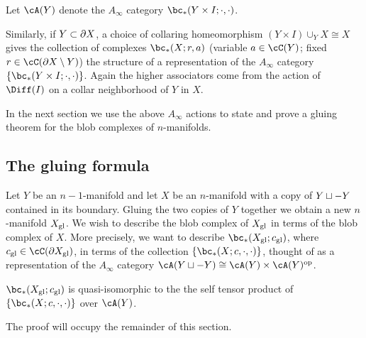 
Let $\cA(Y)$ denote the $A_\infty$ category $\bc_*(Y\times I; \cdot, \cdot)$.

Similarly, if $Y \subset \partial X$, a choice of collaring homeomorphism
$(Y\times I) \cup_Y X \cong X$ gives the collection of complexes $\bc_*(X; r, a)$
(variable $a \in \cC(Y)$; fixed $r \in \cC(\bd X \setmin Y)$) the structure of a representation of the
$A_\infty$ category $\{\bc_*(Y\times I; \cdot, \cdot)\}$.
Again the higher associators come from the action of $\Diff(I)$ on a collar neighborhood
of $Y$ in $X$.

In the next section we use the above $A_\infty$ actions to state and prove
a gluing theorem for the blob complexes of $n$-manifolds.


\subsection{The gluing formula}
\label{sec:gluing-formula}%
Let $Y$ be an $n{-}1$-manifold and let $X$ be an $n$-manifold with a copy
of $Y \sqcup -Y$ contained in its boundary.
Gluing the two copies of $Y$ together we obtain a new $n$-manifold $X_\mathrm{gl}$.
We wish to describe the blob complex of $X_\mathrm{gl}$ in terms of the blob complex
of $X$.
More precisely, we want to describe $\bc_*(X\sgl; c\sgl)$,
where $c\sgl \in \cC(\bd X\sgl)$,
in terms of the collection $\{\bc_*(X; c, \cdot, \cdot)\}$, thought of as a representation
of the $A_\infty$ category $\cA(Y\du-Y) \cong \cA(Y)\times \cA(Y)\op$.

\begin{thm}
$\bc_*(X\sgl; c\sgl)$ is quasi-isomorphic to the the self tensor product
of $\{\bc_*(X; c, \cdot, \cdot)\}$ over $\cA(Y)$.
\end{thm}

The proof will occupy the remainder of this section.


\bigskip



